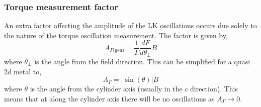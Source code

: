 % 

\subsubsection{Torque measurement factor}

An extra factor affecting the amplitude of the \ac{LK} oscillations occurs due solely to the nature of the torque oscillation measurement. The factor is given by,
\begin{equation}
    A_{\Gamma \textrm{(gen)}} = \frac{1}{F}\frac{dF}{d\theta_\perp}B
\end{equation}
where $\theta_\perp$ is the angle from the field direction. This can be simplified for a quasi $2d$ metal to,
\begin{equation}
    A_{\Gamma} = |\sin(\theta)|B
\end{equation}
where $\theta$ is the angle from the cylinder axis (usually in the $c$ direction). This means that at along the cylinder axis there will be no oscillations as $A_{\Gamma} \to 0$.


